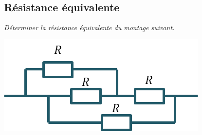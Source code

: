 \documentclass[10pt,fleqn]{article} %
\begin{document}
\begin{multicols}{2}
\section*{Résistance équivalente}
\setcounter{exo}{0}
\textit{Déterminer la résistance équivalente du montage suivant.}
\begin{center}
\includegraphics[width=\linewidth]{images/fig_07}
\end{center}



\end{multicols}
\end{document}
